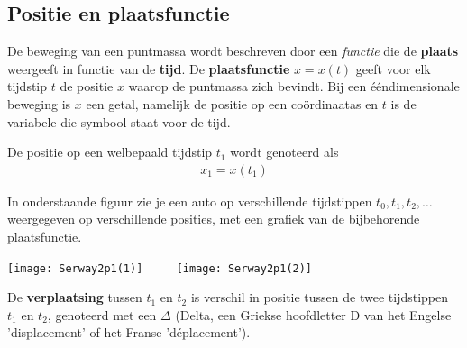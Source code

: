 \documentclass{ximera}
\begin{document}
	\author{Bart Lambregs}
    \xmsource\xmuitleg



	\subsection*{Positie en plaatsfunctie}

	De beweging van een puntmassa wordt beschreven door een \textit{functie} die de \textbf{plaats} weergeeft in functie van de \textbf{tijd}. 
	De \textbf{plaatsfunctie} $x = x(t)$ geeft voor elk tijdstip \(t\) de positie \(x\) waarop de puntmassa zich bevindt. 
	Bij een ééndimensionale beweging is $x$ een getal, namelijk de positie op een coördinaatas
	en $t$ is de variabele die symbool staat voor de tijd.
	

	De positie op een welbepaald tijdstip $t_1$ wordt genoteerd als 
	\begin{eqnarray*}
	x_1=x(t_1)
	\end{eqnarray*}

	In onderstaande figuur zie je een auto op verschillende tijdstippen $t_0,t_1, t_2,\ldots$ weergegeven op verschillende posities, met een grafiek van de bijbehorende plaatsfunctie.
	
	\begin{image}
	\texttt{[image: Serway2p1(1)]}
	$\qquad$   %
	\texttt{[image: Serway2p1(2)]}
	\end{image}
	
	De \textbf{verplaatsing} tussen $t_1$ en $t_2$ is verschil in positie tussen de twee tijdstippen $t_1$ en $t_2$, genoteerd met een $\Delta$ (Delta, een Griekse hoofdletter D  van het Engelse 'displacement' of het Franse 'déplacement').
\end{document}
